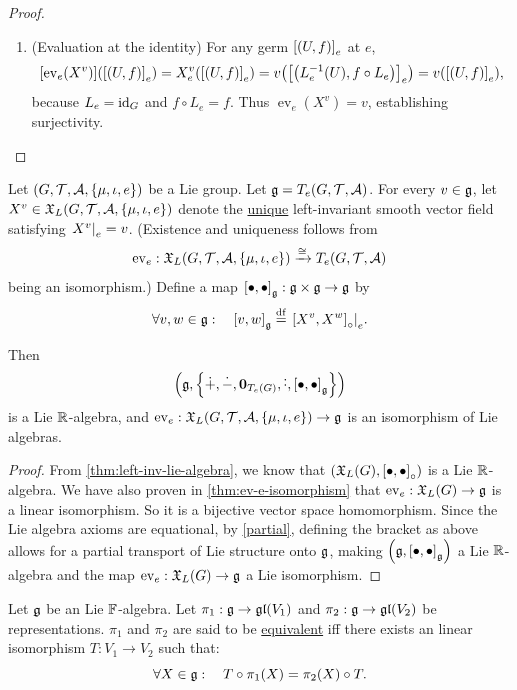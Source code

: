 \documentclass[11pt,reqno]{amsart}
\newcommand{\pwplus}{\mathbin{\dot{+}}}
\newcommand{\pwminus}{\mathbin{\dot{-}}}
\newcommand{\pwcdot}{\mathbin{\dot{\cdot}}}
\begin{document}
\begin{proof}
\begin{enumerate}
\begin{enumerate}
\item (Evaluation at the identity)
For any germ $\SqBr{(U,f)}_{e}$ at $e$,
\[\begin{aligned}
\FUNC{\operatorname{ev}_e(X^v)}{\SqBr{(U,f)}_{e}}
=X^v_e\Br{\SqBr{(U,f)}_{e}}
=v\Br{\SqBr{\Br{L_e\inv(U),f\circ L_e}}_{e}}
=v\Br{\SqBr{(U,f)}_{e}},
\end{aligned}\]
because $L_e=\mathrm{id}_G$ and $f\circ L_e=f$.
Thus $\operatorname{ev}_e(X^v)=v$, establishing surjectivity.
\end{enumerate}
\end{enumerate}
\end{proof}

\begin{Thm}
Let $(G,\T,\A,\set{\mu,\iota,e})$ be a Lie group.
Let $\mathfrak{g}=T_e(G,\mathcal{T},\mathcal{A})$.
For every $v\in\mathfrak{g}$,
let $X^v\in\X_L(G,\T,\A,\set{\mu,\iota,e})$
denote the \ul{unique} left-invariant smooth vector field satisfying
$\eval{X^v}_{e}=v$.
(Existence and uniqueness follows from
\[
\ev_e:\X_L(G,\T,\A,\set{\mu,\iota,e})\xrightarrow{\cong} T_e(G,\T,\A)
\]
being an isomorphism.)
Define a map $\SqBr{\bullet,\bullet}_\g:\g\times\g\to\g$ by
\[\forall v,w\in\g:\quad\SqBr{v,w}_\g\df\eval{\SqBr{X^v,X^w}_\circ}_e.\]

Then
\[
\Br{\g,\set{\pwplus,\pwminus,\bm0_{T_e(G)},\pwcdot,\SqBr{\bullet,\bullet}_\g}}
\]
is a Lie $\mathbb{R}$-algebra, and $\ev_e:\X_L(G,\T,\A,\set{\mu,\iota,e})\to\g$
is an isomorphism of Lie algebras.
\end{Thm}
\begin{proof}
From \ref{thm:left-inv-lie-algebra},
we know that $\Br{\X_L(G),\SqBr{\bullet,\bullet}_\circ}$ is a
Lie $\mathbb{R}$-algebra.
We have also proven in
\ref{thm:ev-e-isomorphism}
that $\mathrm{ev}_e:\mathfrak{X}_L(G)\to\mathfrak{g}$ is a linear isomorphism.
So it is a bijective vector space homomorphism.
Since the Lie algebra axioms are equational,
by \ref{partial}, defining the bracket as above
allows for a partial transport of Lie structure
onto $\mathfrak{g}$, making $\Br{\g,\SqBr{\bullet,\bullet}_\g}$ a Lie $\mathbb{R}$-algebra
and the map $\mathrm{ev}_e:\mathfrak{X}_L(G)\to\mathfrak{g}$ a Lie isomorphism.
\end{proof}

\begin{Def}
Let $\mathfrak{g}$ be an Lie $\mathbb{F}$-algebra.
Let $\pi_1:\mathfrak{g}\to\mathfrak{gl}(V_1)$ and $\pi_2:\mathfrak{g}\to\mathfrak{gl}(V_2)$ be representations.
$\pi_1$ and $\pi_2$ are said to be \ul{equivalent} iff
there exists an linear isomorphism $T:V_1\to V_2$ such that:
\[\forall X\in\mathfrak{g}:\quad T\circ\pi_1(X)=\pi_2(X)\circ T.\]
\end{Def}
\end{document}
